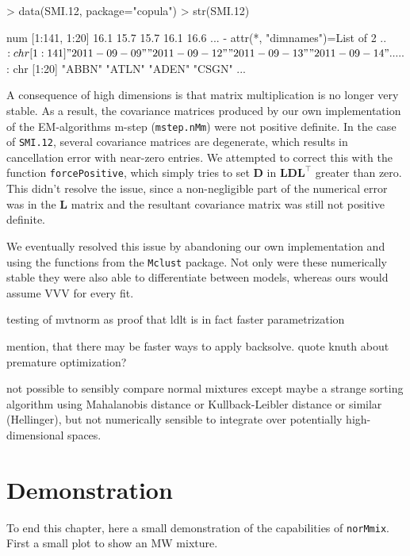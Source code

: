 \begin{Schunk}
\begin{Sinput}
> data(SMI.12, package="copula")
> str(SMI.12)
\end{Sinput}
\begin{Soutput}
 num [1:141, 1:20] 16.1 15.7 15.7 16.1 16.6 ...
 - attr(*, "dimnames")=List of 2
  ..$ : chr [1:141] "2011-09-09" "2011-09-12" "2011-09-13" "2011-09-14" ...
  ..$ : chr [1:20] "ABBN" "ATLN" "ADEN" "CSGN" ...
\end{Soutput}
\end{Schunk}

A consequence of high dimensions is that matrix multiplication is no longer
very stable. As a result, the covariance matrices produced by our own 
implementation of the EM-algorithms m-step ({\tt mstep.nMm}) were not positive
definite.
In the case of {\tt SMI.12}, several covariance matrices are degenerate, which
results in cancellation error with near-zero entries.
We attempted to correct this with the function {\tt forcePositive}, which 
simply tries to set $\pmb{D}$ in $\pmb{LDL}^\top$ greater than zero.
This didn't resolve the issue, since a non-negligible part of the numerical
error was in the $\pmb{L}$ matrix and the resultant covariance matrix was still
not positive definite.

We eventually resolved this issue by abandoning our own implementation and 
using the functions from the {\tt Mclust} package. Not only were these 
numerically stable they were also able to differentiate between models, whereas
ours would assume VVV for every fit.

testing of mvtnorm as proof that ldlt is in fact faster parametrization

mention, that there may be faster ways to apply backsolve. 
quote knuth about premature optimization?

not possible to sensibly compare normal mixtures except maybe a strange sorting 
algorithm using Mahalanobis distance or Kullback-Leibler distance or similar
(Hellinger), but not numerically sensible to integrate over potentially 
high-dimensional spaces.



\section{Demonstration}

To end this chapter, here a small demonstration of the capabilities of 
{\tt norMmix}. First a small plot to show an MW mixture.

